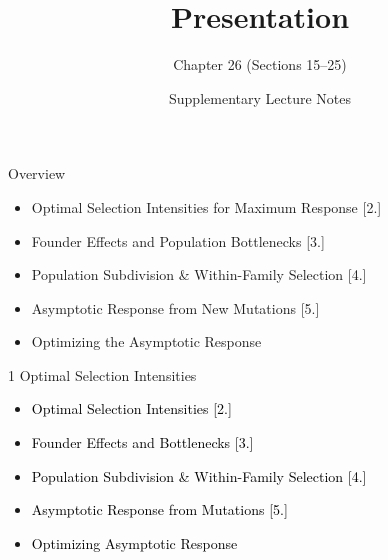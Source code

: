 \documentclass[10pt, aspectratio=169]{ctexbeamer}
\title{Presentation}
\subtitle{Chapter 26 (Sections 15--25)}
\author{Supplementary Lecture Notes}
\date{}
\begin{document}
{
\begin{frame}
  \titlepage
\end{frame}
}

\begin{frame}{Overview}
  \begin{itemize}
    \item Optimal Selection Intensities for Maximum Response [2.]
    \item Founder Effects and Population Bottlenecks [3.]
    \item Population Subdivision \& Within-Family Selection [4.]
    \item Asymptotic Response from New Mutations [5.]
    \item Optimizing the Asymptotic Response
  \end{itemize}
\end{frame}

\begin{frame}{1 Optimal Selection Intensities}
  \vfill
  \begin{center}
    \begin{minipage}{0.7\textwidth}
      \begin{itemize}
        \setlength{\itemsep}{0.3\baselineskip}
        \item[\textcolor{black}{\textbf{1.}}] \textcolor{black}{Optimal Selection Intensities [2.]}
        \item[\textcolor{black}{\textbf{2.}}] \textcolor{black}{Founder Effects and Bottlenecks [3.]}
        \item[\textcolor{black}{\textbf{3.}}] \textcolor{black}{Population Subdivision \& Within-Family Selection [4.]}
        \item[\textcolor{black}{\textbf{4.}}] \textcolor{black}{Asymptotic Response from Mutations [5.]}
        \item[\textcolor{black}{\textbf{5.}}] \textcolor{black}{Optimizing Asymptotic Response}
      \end{itemize}
    \end{minipage}
  \end{center}
  \vfill
\end{frame}
\end{document}
